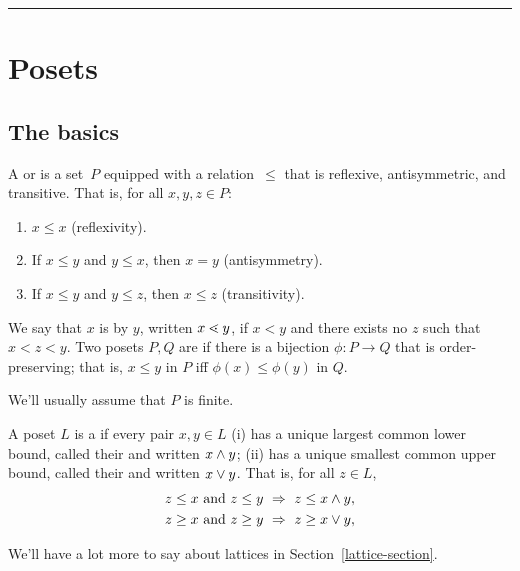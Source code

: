 

\thispagestyle{empty}

\newcommand{\tikzposetscale}{0.7}
\newcommand{\tikzvertexsize}{0.8ex}


\bigskip\hrule

\section{Posets}

\subsection{The basics}

\begin{definition}
A  or  is a set~$P$ equipped with a relation~$\leq$ that is reflexive, antisymmetric, and transitive.  That is, for all $x,y,z\in P$:
\begin{enumerate}
\item $x\leq x$ (reflexivity).
\item If $x\leq y$ and $y\leq x$, then $x=y$ (antisymmetry).
\item If $x\leq y$ and $y\leq z$, then $x\leq z$ (transitivity).
\end{enumerate}
We say that $x$ is  by $y$, written $x\lessdot y$, if $x<y$
and there exists no $z$ such that $x<z<y$.  Two posets $P,Q$ are  if there is a bijection $\phi:P\to Q$ that is order-preserving; that is, $x\leq y$ in $P$ iff $\phi(x)\leq\phi(y)$ in $Q$.
\end{definition}

We'll usually assume that $P$ is finite.

\begin{definition} A poset $L$ is a  if every pair $x,y\in L$
(i) has a unique largest common lower bound, called their  and written $x\wedge y$; 
(ii) has a unique smallest common upper bound, called their  and written $x\vee y$.
That is, for all $z\in L$,
\begin{align*}
z\leq x \text{ and } z\leq y &~\Rightarrow~ z \leq x\wedge y,\\
z\geq x \text{ and } z\geq y &~\Rightarrow~ z \geq x\vee y,
\end{align*}
\end{definition}
We'll have a lot more to say about lattices in Section~\ref{lattice-section}.

